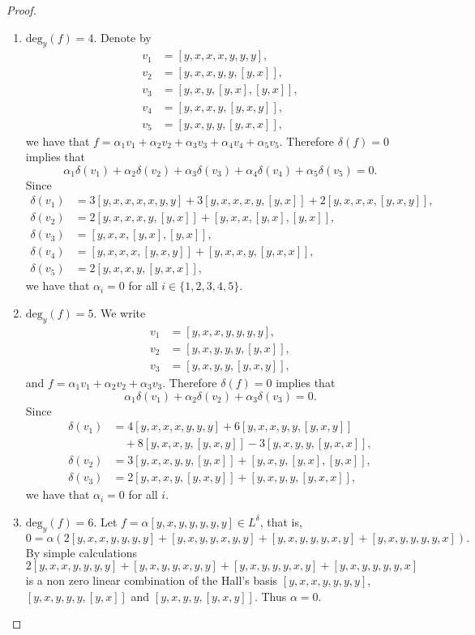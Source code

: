 \documentclass[10pt,a4paper]{amsart}
\begin{document}
\begin{proof}
\begin{enumerate}
\item $\mbox{deg}_y(f) = 4$.  Denote by 
\begin{align*}
v_1 &= [y, x, x, x, y, y, y],\\
v_2 &= [y, x, x, y, y, [y, x]],\\
v_3 &= [y, x, y, [y,x], [y, x]],\\
v_4 &= [y, x, x, y, [y, x, y]],\\
v_5 &= [y, x, y, y, [y, x, x]],
\end{align*}
we have that $f = \alpha_1 v_1 + \alpha_2 v_2  + \alpha_3 v_3 + \alpha_4 v_4 + \alpha_5 v_5$. Therefore $\delta(f) = 0$ implies that 
$$\alpha_1 \delta(v_1) + \alpha_2 \delta (v_2)  + \alpha_3 \delta (v_3) + \alpha_4 \delta (v_4)+ \alpha_5 \delta (v_5) = 0.$$ 
Since  
\begin{align*}
\delta(v_1)  &= 3 [y, x, x, x, x, y, y] + 3[y, x, x, x, y, [y, x]] + 2[y, x, x, x, [y, x, y]],\\
\delta(v_2) &= 2[y, x, x, x, y, [y, x]] + [y, x, x, [y, x], [y, x]],\\ \delta(v_3) &=  [y, x, x, [y, x], [y, x]],\\
\delta(v_4) &= [y, x, x, x, [y, x, y]] + [y, x, x, y, [y, x, x]],\\
\delta(v_5) &= 2[y, x, x, y, [y, x, x]],
\end{align*}
we have that $\alpha_i =  0$ for all $i \in \{1, 2, 3, 4, 5\}$.

\item $\mbox{deg}_y(f) = 5$.   We write 
\begin{align*}
v_1 &= [y, x, x, y, y, y, y],\\
v_2 &= [y, x, y, y, y, [y, x]],\\
v_3 &= [y, x, y, y, [y, x, y]],
\end{align*}
and $f = \alpha_1 v_1 + \alpha_2 v_2  + \alpha_3 v_3$. Therefore $\delta(f) = 0$ implies that 
$$\alpha_1 \delta(v_1) + \alpha_2 \delta (v_2)  + \alpha_3 \delta (v_3) = 0.$$ 
Since 
\begin{align*}
\delta(v_1) 
&= 4[y, x, x, x, y, y, y] 
+ 6[y, x, x, y, y, [y, x, y]] \\
&\quad + 8[y, x, x, y, [y, x, y]] 
- 3[y, x, y, y, [y, x, x]], \\
\delta(v_2) 
&= 3[y, x, x, y, y, [y, x]] 
+ [y, x, y, [y, x], [y, x]], \\
\delta(v_3) 
&= 2[y, x, x, y, [y, x, y]] 
+ [y, x, y, y, [y, x, x]],
\end{align*}
 we have that  $\alpha_i =  0$ for all $i$.

\item $\mbox{deg}_y(f) = 6$. Let $f = \alpha [y, x, y, y, y, y, y]  \in L^\delta$, that is, 
\[
0 = \alpha(2 [y, x, x, y, y, y, y]+ [y, x, y, y, x, y, y] + [y, x, y, y, y, x, y] + [y, x, y, y, y, y, x]).
\]
By simple calculations 
\[
2 [y, x, x, y, y, y, y] + [y, x, y, y, x, y, y] + [y, x, y, y, y, x, y] + [y, x, y, y, y, y, x]
\]
is a non zero linear combination of the Hall's basis $[y, x, x, y, y, y, y]$, $[y, x, y, y, y, [y, x]]$ and $[y, x, y, y, [y, x, y]]$. Thus $\alpha = 0$.
\end{enumerate}
\vspace{-.77cm}
\end{proof}
\end{document}

